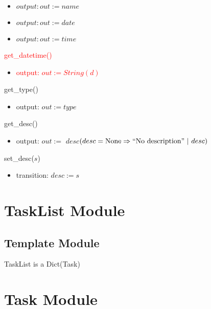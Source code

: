 \documentclass[12pt, titlepage]{article}
\begin{document}
\begin{itemize}
    \item {\sout{$output: out := name$}}
\end{itemize}

\begin{itemize}
    \item {\sout{$output: out := date$}}
\end{itemize}

\begin{itemize}
    \item {\sout{$output: out := time$}}
\end{itemize}

\noindent \textcolor{red}{get\_datetime()}
\begin{itemize}
    \item \textcolor{red}{output: $out := String(d)$}
\end{itemize}

\noindent get\_type()
\begin{itemize}
    \item output: $out := type$
\end{itemize}

\noindent get\_desc()
\begin{itemize}
    \item output: $out :=$ \sout{$desc$}\textcolor{red}{$ (desc = \text{None} \Rightarrow ``\text{No description}"\ |\ desc)$}
\end{itemize}

\noindent set\_desc($s$)
\begin{itemize}
    \item transition: $desc := s$
\end{itemize}

\newpage

\section*{TaskList Module}

\subsection*{Template Module}
TaskList is a Dict(Task)

\newpage

\section*{Task Module}
\end{document}
